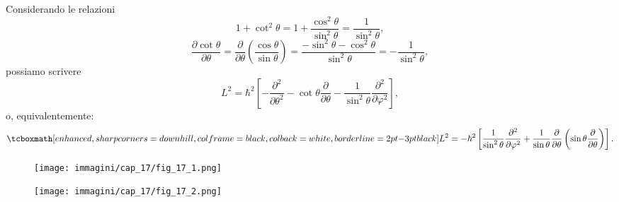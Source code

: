 \documentclass[a4paper,12pt,oneside]{book}
\begin{document}
Considerando le relazioni
	\begin{equation}
		1+ \cot ^2 \theta = 1+\frac{\cos ^2 \theta}{\sin ^2 \theta} = \frac{1}{\sin ^2 \theta},
	\end{equation}
	\begin{equation}
		\frac{\partial \cot \theta}{\partial \theta}= \frac{\partial}{\partial \theta}\left( \frac{\cos  \theta}{\sin \theta} \right) = \frac{-\sin ^ 2 \theta - \cos ^2 \theta}{\sin ^2 \theta}=-\frac{1}{\sin ^2 \theta},
	\end{equation}
possiamo scrivere
	\begin{equation}
		L^2 = \hbar ^2 \left[- \frac{\partial ^2}{\partial \theta ^2}-\cot \theta \frac{\partial}{\partial \theta}- \frac{1}{\sin ^2 \theta}\frac{\partial ^2}{\partial \varphi ^2}\right] ,
	\end{equation}
o, equivalentemente:
	\begin{equation}
		\tcboxmath[enhanced, sharp corners=downhill, colframe=black, colback=white, borderline={2pt}{-3pt}{black}]{
			L^2 = -\hbar ^2 \left[\frac{1}{\sin ^2 \theta}\frac{\partial ^2}{\partial \varphi ^2}+\frac{1}{\sin \theta}\frac{\partial}{\partial \theta} \left(\sin \theta \frac{\partial}{\partial \theta}\right)\right] .
			}
	\end{equation}
\newpage
\begin{figure}[!htbp]
\begin{center}
\texttt{[image: immagini/cap\_17/fig\_17\_1.png]}\\
\end{center}
\end{figure}
\begin{figure}[!htbp]
\begin{center}
\texttt{[image: immagini/cap\_17/fig\_17\_2.png]}\\
\end{center}
\end{figure}
\end{document}
